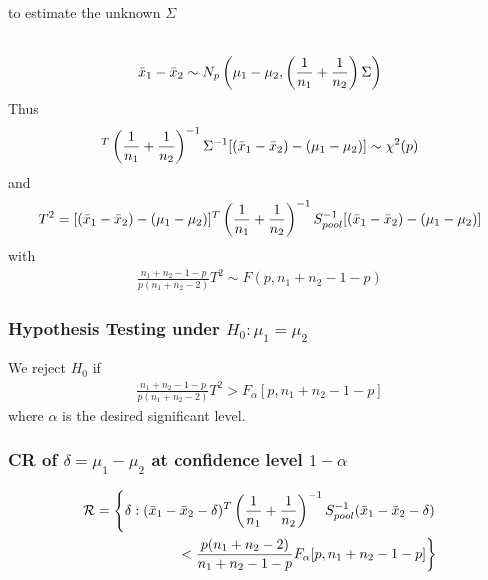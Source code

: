 \documentclass[12pt]{extarticle}
\newcommand{\<}{\langle}
\renewcommand{\>}{\rangle}
\theoremstyle{definition}
\begin{document}
to estimate the unknown $\Sigma$\\
\ \\
\begin{tcolorbox}[enhanced, drop fuzzy shadow, title=Hoteling's $T^2$ statistic]
\begin{eqnarray*}
\Bar{x}_1 - \Bar{x}_2 \sim N_p \left( \mu_1 - \mu_2, \left( \frac{1}{n_1} + \frac{1}{n_2} \right) \Sigma \right)
\end{eqnarray*}
Thus
\begin{eqnarray*}
[(\Bar{x}_1 - \Bar{x}_2) - (\mu_1 - \mu_2)]^T \left( \frac{1}{n_1} + \frac{1}{n_2} \right)^{-1} \Sigma^{-1} [(\Bar{x}_1 - \Bar{x}_2) - (\mu_1 - \mu_2)] \sim \chi^2(p)
\end{eqnarray*}
and
\begin{eqnarray*}
T^2 = [(\Bar{x}_1 - \Bar{x}_2) - (\mu_1 - \mu_2)]^T \left( \frac{1}{n_1} + \frac{1}{n_2} \right)^{-1} S_{pool}^{-1} [(\Bar{x}_1 - \Bar{x}_2) - (\mu_1 - \mu_2)]
\end{eqnarray*}
with
\begin{eqnarray*}
\frac{n_1 + n_2 - 1 - p}{p(n_1 + n_2 -2)}
T^2 \sim F(p, n_1 + n_2 -1-p)
\end{eqnarray*}
\end{tcolorbox}

\newpage
\subsubsection{Hypothesis Testing under $H_0: \mu_1 = \mu_2$}
We reject $H_0$ if
\begin{align*}
    \frac{n_1 + n_2 -1-p}{p(n_1 + n_2 -2)}T^2 > F_{\alpha} [p, n_1 + n_2 -1-p]
\end{align*}
where $\alpha$ is the desired significant level.\\

\subsubsection{CR of $\delta = \mu_1 - \mu_2$ at confidence level $1-\alpha$}
\begin{tcolorbox}[enhanced, drop fuzzy shadow, title=CR for unpaied two-sample]
\begin{eqnarray*}
\mathcal{R} = \left\{ \delta : (\Bar{x}_1 - \Bar{x}_2 -\delta)^T \left( \frac{1}{n_1}+\frac{1}{n_2} \right)^{-1} S^{-1}_{pool} (\Bar{x}_1 - \Bar{x}_2 -\delta)\right. \\
\left. < \frac{p(n_1 + n_2 -2)}{n_1 + n_2 -1-p} F_{\alpha}[p, n_1 + n_2 -1-p] \right\}
\end{eqnarray*}
\end{tcolorbox}
\end{document}
